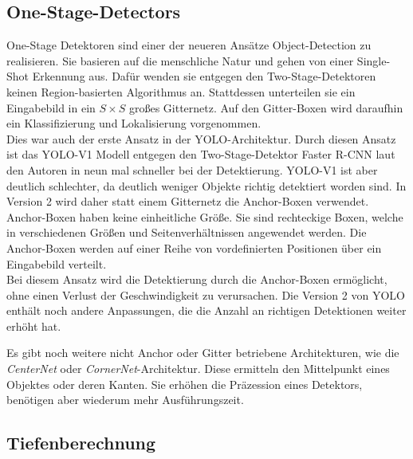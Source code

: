 \subsection{One-Stage-Detectors}

One-Stage Detektoren sind einer der neueren Ansätze Object-Detection zu realisieren.
Sie basieren auf die menschliche Natur und gehen von einer Single-Shot Erkennung aus. Dafür wenden sie entgegen den Two-Stage-Detektoren keinen Region-basierten Algorithmus an.
Stattdessen unterteilen sie ein Eingabebild in ein $S \times  S$ großes Gitternetz. Auf den Gitter-Boxen wird daraufhin ein Klassifizierung und Lokalisierung vorgenommen.\\
Dies war auch der erste Ansatz in der \ac{YOLO}-Architektur. Durch diesen Ansatz ist das \ac{YOLO}-V1 Modell entgegen den Two-Stage-Detektor Faster \ac{R-CNN} laut den Autoren in \cite{YOLO_V3} neun mal schneller bei der Detektierung. \ac{YOLO}-V1 ist aber deutlich schlechter, da deutlich weniger Objekte richtig detektiert worden sind. In Version 2 wird daher statt einem Gitternetz die Anchor-Boxen verwendet. Anchor-Boxen haben keine einheitliche Größe. Sie sind rechteckige Boxen, welche in verschiedenen Größen und Seitenverhältnissen angewendet werden. Die Anchor-Boxen werden auf einer Reihe von vordefinierten Positionen über ein Eingabebild verteilt.\\
Bei diesem Ansatz wird die Detektierung durch die Anchor-Boxen ermöglicht, ohne einen Verlust der Geschwindigkeit zu verursachen. Die Version 2 von \ac{YOLO} enthält noch andere Anpassungen, die die Anzahl an richtigen Detektionen weiter erhöht hat.
\cite{YOLO_V3}

Es gibt noch weitere nicht Anchor oder Gitter betriebene Architekturen, wie die \textit{CenterNet} oder \textit{CornerNet}-Architektur. Diese ermitteln den Mittelpunkt eines Objektes oder deren Kanten. Sie erhöhen die Präzession eines Detektors, benötigen aber wiederum mehr Ausführungszeit.\cite{yolo_all}

\subsection{Tiefenberechnung}

